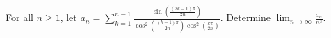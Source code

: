 For all $n\ge 1$, let $a_n=\sum_{k=1}^{n-1}\frac{\sin(\frac{(2k-1)\pi}{2n})}{\cos^2(\frac{(k-1)\pi}{2n})\cos^2(\frac{k\pi}{2n})}$. Determine $\lim_{n\rightarrow \infty}\frac{a_n}{n^3}$.